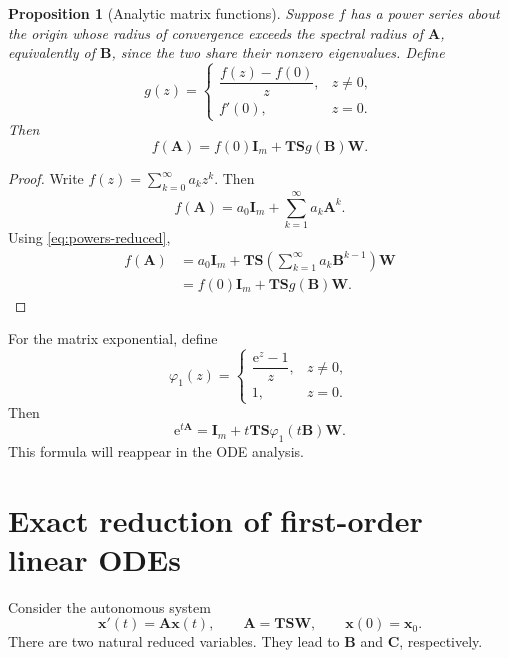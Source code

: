 \documentclass[11pt]{article}
\newcommand{\I}{\mathbf{I}}
\newcommand{\mat}[1]{\mathbf{#1}}
\newcommand{\vect}[1]{\mathbf{#1}}
\newcommand{\e}{\mathrm{e}}
\newtheorem{proposition}[proposition]{Proposition}
\theoremstyle{definition}
\theoremstyle{remark}
\begin{document}
\begin{proposition}[Analytic matrix functions]
\label{prop:matrix-functions}
Suppose \(f\) has a power series about the origin whose radius of convergence exceeds the spectral radius of \(\mat{A}\), equivalently of \(\mat{B}\), since the two share their nonzero eigenvalues. Define
\begin{equation}
  g(z)=
  \begin{cases}
    \dfrac{f(z)-f(0)}{z},&z\neq0,\\[6pt]
    f'(0),&z=0.
  \end{cases}
  \label{eq:g-definition}
\end{equation}
Then
\begin{equation}
  f(\mat{A})
  =f(0)\I_m+\mat{T}\mat{S}g(\mat{B})\mat{W}.
  \label{eq:matrix-function-reduction}
\end{equation}
\end{proposition}

\begin{proof}
Write \(f(z)=\sum_{k=0}^{\infty}a_kz^k\). Then
\[
  f(\mat{A})
  =a_0\I_m+
   \sum_{k=1}^{\infty}a_k\mat{A}^k.
\]
Using \cref{eq:powers-reduced},
\begin{align*}
  f(\mat{A})
  &=a_0\I_m+
    \mat{T}\mat{S}
    \left(
      \sum_{k=1}^{\infty}a_k\mat{B}^{k-1}
    \right)
    \mat{W}\\
  &=f(0)\I_m+\mat{T}\mat{S}g(\mat{B})\mat{W}.
\end{align*}
\end{proof}

For the matrix exponential, define
\begin{equation}
  \varphi_1(z)=
  \begin{cases}
    \dfrac{\e^z-1}{z},&z\neq0,\\[6pt]
    1,&z=0.
  \end{cases}
  \label{eq:phi1}
\end{equation}
Then
\begin{equation}
  \e^{t\mat{A}}
  =\I_m+t\mat{T}\mat{S}\varphi_1(t\mat{B})\mat{W}.
  \label{eq:exponential-reduction}
\end{equation}
This formula will reappear in the ODE analysis.

\section{Exact reduction of first-order linear ODEs}
\label{sec:ode-reduction}

Consider the autonomous system
\begin{equation}
  \vect{x}'(t)=\mat{A}\vect{x}(t),
  \qquad
  \mat{A}=\mat{T}\mat{S}\mat{W},
  \qquad
  \vect{x}(0)=\vect{x}_0.
  \label{eq:full-ode}
\end{equation}
There are two natural reduced variables. They lead to \(\mat{B}\) and \(\mat{C}\), respectively.
\end{document}
